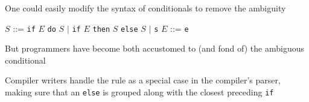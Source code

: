 \documentclass[8pt,a4paper,compress,handout]{beamer}
\newcommand{\mm}[1]{$#1$}
\newenvironment{spaced}
{
\smallskip
\hspace{.5cm}
\begin{minipage}[c]{\textwidth}
}
{
\end{minipage}
\smallskip
}
\begin{document}
\begin{frame}[fragile]
\pause

One could easily modify the syntax of conditionals to remove the ambiguity

\text{ }
\begin{spaced}
\begin{production}
\mm{S} ::= \lstinline{if} \mm{E} \lstinline{do} \mm{S}
      \mm{|} \lstinline{if} \mm{E} \lstinline{then} \mm{S} \lstinline{else} \mm{S}
      \mm{|} \lstinline{s}
\mm{E} ::= \lstinline{e}
\end{production}
\end{spaced}

\pause
\bigskip

But programmers have become both accustomed to (and fond of) the ambiguous conditional

\pause
\bigskip

Compiler writers handle the rule as a special case in the compiler's parser, making sure that an \lstinline{else} is grouped along with the closest preceding \lstinline{if}
\end{frame}
\end{document}
